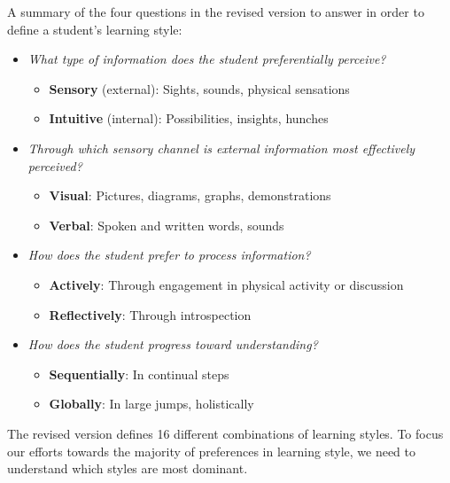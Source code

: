 \begin{kasse} 
A summary of the four questions in the revised version to answer in order to define a student's learning style:
\vspace{-3mm}
\begin{itemize}
  \setlength\itemsep{0.05em}
  \item \textit{What type of information does the student preferentially perceive?}
  \vspace{-3mm}
  \begin{itemize}
  \setlength\itemsep{0.05em}
  \item \textbf{Sensory} (external): Sights, sounds, physical sensations
  \item \textbf{Intuitive} (internal): Possibilities, insights, hunches
\end{itemize}
\item \textit{Through which sensory channel is external information most effectively perceived?}
\vspace{-3mm}
\begin{itemize}
  \setlength\itemsep{0.05em}
  \item \textbf{Visual}: Pictures, diagrams, graphs, demonstrations
  \item \textbf{Verbal}: Spoken and written words, sounds 
\end{itemize}
\item \textit{How does the student prefer to process information?}
\vspace{-3mm}
\begin{itemize}
  \setlength\itemsep{0.05em}
  \item \textbf{Actively}: Through engagement in physical activity or discussion
  \item \textbf{Reflectively}: Through introspection
\end{itemize}
\item \textit{How does the student progress toward understanding?}
\vspace{-3mm}
\begin{itemize}
  \setlength\itemsep{0.05em}
  \item \textbf{Sequentially}: In continual steps
  \item \textbf{Globally}: In large jumps, holistically
\end{itemize}
\end{itemize}
\end{kasse}

\noindent 
The revised version defines 16 different combinations of learning styles. To focus our efforts towards the majority of preferences in learning style, we need to understand which styles are most dominant.


